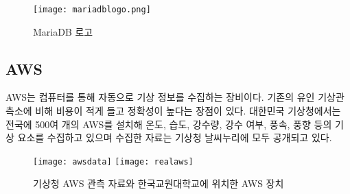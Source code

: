\begin{figure}[htbp]
	\centering
	\texttt{[image: mariadblogo.png]}
	\caption{MariaDB 로고}
	\label{MariaDB}
\end{figure}

\subsection{AWS}
AWS는 컴퓨터를 통해 자동으로 기상 정보를 수집하는 장비이다. 기존의 유인 기상관측소에 비해 비용이 적게 들고 정확성이 높다는 장점이 있다. 대한민국 기상청에서는 전국에 500여 개의 AWS를 설치해 온도, 습도, 강수량, 강수 여부, 풍속, 풍향 등의 기상 요소를 수집하고 있으며 수집한 자료는 기상청 날씨누리에 모두 공개되고 있다.

\begin{figure}[htbp]
	\centering
	\texttt{[image: awsdata]}
	\texttt{[image: realaws]}
	\caption{기상청 AWS 관측 자료와 한국교원대학교에 위치한 AWS 장치}
	\label{AWS}
\end{figure}